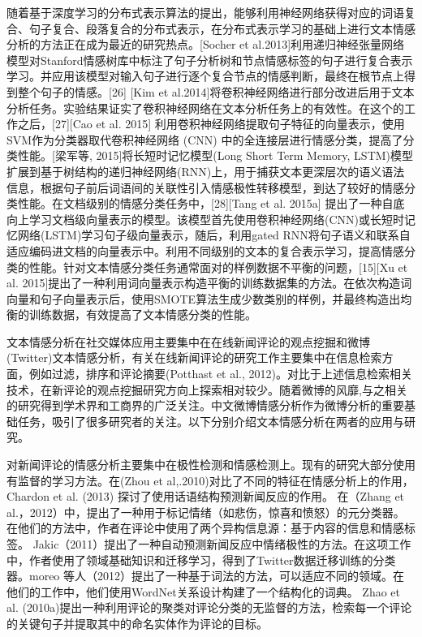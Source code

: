 随着基于深度学习的分布式表示算法的提出，能够利用神经网络获得对应的词语复合、句子复合、段落复合的分布式表示，在分布式表示学习的基础上进行文本情感分析的方法正在成为最近的研究热点。[Socher et al.2013]利用递归神经张量网络模型对Stanford情感树库中标注了句子分析树和节点情感标签的句子进行复合表示学习。并应用该模型对输入句子进行逐个复合节点的情感判断，最终在根节点上得到整个句子的情感。[26] [Kim et al.2014]将卷积神经网络进行部分改进后用于文本分析任务。实验结果证实了卷积神经网络在文本分析任务上的有效性。在这个的工作之后，[27][Cao et al. 2015] 利用卷积神经网络提取句子特征的向量表示，使用SVM作为分类器取代卷积神经网络 (CNN) 中的全连接层进行情感分类，提高了分类性能。[梁军等, 2015]将长短时记忆模型(Long Short Term Memory, LSTM)模型扩展到基于树结构的递归神经网络(RNN)上，用于捕获文本更深层次的语义语法信息，根据句子前后词语间的关联性引入情感极性转移模型，到达了较好的情感分类性能。在文档级别的情感分类任务中，[28][Tang et al. 2015a] 提出了一种自底向上学习文档级向量表示的模型。该模型首先使用卷积神经网络(CNN)或长短时记忆网络(LSTM)学习句子级向量表示，随后，利用gated RNN将句子语义和联系自适应编码进文档的向量表示中。利用不同级别的文本的复合表示学习，提高情感分类的性能。针对文本情感分类任务通常面对的样例数据不平衡的问题，[15][Xu et al. 2015]提出了一种利用词向量表示构造平衡的训练数据集的方法。在依次构造词向量和句子向量表示后，使用SMOTE算法生成少数类别的样例，并最终构造出均衡的训练数据，有效提高了文本情感分类的性能。


文本情感分析在社交媒体应用主要集中在在线新闻评论的观点挖掘和微博(Twitter)文本情感分析，有关在线新闻评论的研究工作主要集中在信息检索方面，例如过滤，排序和评论摘要(Potthast et al., 2012)。对比于上述信息检索相关技术，在新评论的观点挖掘研究方向上探索相对较少。随着微博的风靡,与之相关的研究得到学术界和工商界的广泛关注。中文微博情感分析作为微博分析的重要基础任务，吸引了很多研究者的关注。以下分别介绍文本情感分析在两者的应用与研究。

对新闻评论的情感分析主要集中在极性检测和情感检测上。现有的研究大部分使用有监督的学习方法。在(Zhou et al,.2010)对比了不同的特征在情感分析上的作用，Chardon et al. (2013) 探讨了使用话语结构预测新闻反应的作用。 在（Zhang et al.，2012）中，提出了一种用于标记情绪（如悲伤，惊喜和愤怒）的元分类器。在他们的方法中，作者在评论中使用了两个异构信息源：基于内容的信息和情感标签。 Jakic（2011）提出了一种自动预测新闻反应中情绪极性的方法。在这项工作中，作者使用了领域基础知识和迁移学习，得到了Twitter数据迁移训练的分类器。moreo 等人（2012）提出了一种基于词法的方法，可以适应不同的领域。在他们的工作中，他们使用WordNet关系设计构建了一个结构化的词典。 Zhao et al. (2010a)提出一种利用评论的聚类对评论分类的无监督的方法，检索每一个评论的关键句子并提取其中的命名实体作为评论的目标。


